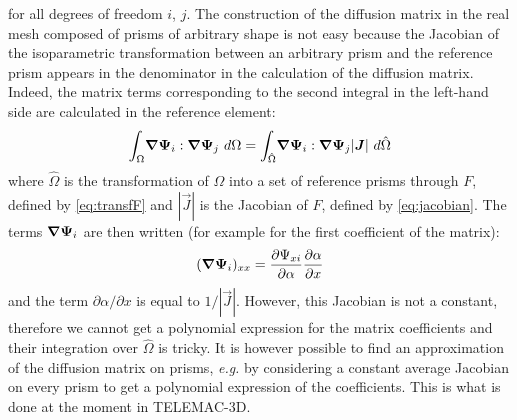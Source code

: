 for all degrees of freedom $i$, $j$.
The construction of the diffusion matrix in the real mesh composed of prisms
of arbitrary shape is not easy because the Jacobian of the isoparametric
transformation between an arbitrary prism and the reference prism appears
in the denominator in the calculation of the diffusion matrix.
Indeed, the matrix terms corresponding to the second integral in the
left-hand side are calculated in the reference element:
\begin{equation}
\displaystyle{\int_\Omega}\bm{\nabla}\bm{\Psi}_i:\bm{\nabla}\bm{\Psi}_j~d\Omega=
\displaystyle{\int_{\hat{\Omega}}}\bm{\nabla}\bm{\Psi}_i:\bm{\nabla}\bm{\Psi}_j
|\bm{J}|~d\hat{\Omega}
\end{equation}
where $\hat{\Omega}$ is the transformation of $\Omega$ into a set of
reference prisms through $F$, defined by \eqref{eq:transfF}
and $|\vec{J}|$ is the Jacobian of $F$, defined by \eqref{eq:jacobian}.
The terms $\bm{\nabla}\bm{\Psi}_i$ are then written (for example for the first
coefficient of the matrix):
\begin{equation}
(\bm{\nabla}\bm{\Psi}_i)_{xx}=\dfrac{\partial \Psi_{xi}}{\partial \alpha}\dfrac{\partial \alpha}{\partial x}
\end{equation}
and the term $\partial \alpha / \partial x$ is equal to $1/|\vec{J}|$.
However, this Jacobian is not a constant, therefore
we cannot get a polynomial expression for the matrix coefficients and
their integration over $\hat{\Omega}$ is tricky.
It is however possible to find an approximation of the diffusion matrix on
prisms, \textit{e.g.} by considering a constant average Jacobian on
every prism to get a polynomial expression of the coefficients.
This is what is done at the moment in TELEMAC-3D. \\

